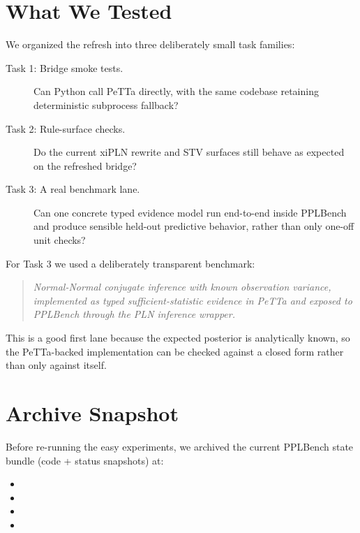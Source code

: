 \documentclass[11pt,openany]{report}
\begin{document}
\section{What We Tested}

We organized the refresh into three deliberately small task families:
\begin{description}
\item[Task 1: Bridge smoke tests.] Can Python call PeTTa directly, with the
same codebase retaining deterministic subprocess fallback?
\item[Task 2: Rule-surface checks.] Do the current xiPLN rewrite and STV
surfaces still behave as expected on the refreshed bridge?
\item[Task 3: A real benchmark lane.] Can one concrete typed evidence model
run end-to-end inside PPLBench and produce sensible held-out predictive
behavior, rather than only one-off unit checks?
\end{description}

For Task 3 we used a deliberately transparent benchmark:
\begin{quote}
\emph{Normal-Normal conjugate inference with known observation variance,
implemented as typed sufficient-statistic evidence in PeTTa and exposed to
PPLBench through the PLN inference wrapper.}
\end{quote}
This is a good first lane because the expected posterior is analytically
known, so the PeTTa-backed implementation can be checked against a closed
form rather than only against itself.

\section{Archive Snapshot}

Before re-running the easy experiments, we archived the current PPLBench
state bundle (code + status snapshots) at:
\begin{itemize}
\item {}
\item {}
\item {}
\item {}
\end{itemize}
\end{document}
